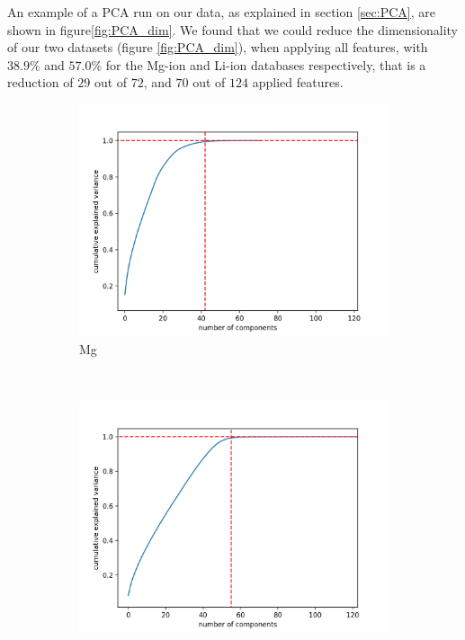 	An example of a PCA run on our data, as explained in section \ref{sec:PCA}, are shown in figure\ref{fig:PCA_dim}. We found that we could reduce the dimensionality of our two datasets (figure \ref{fig:PCA_dim}), when applying all features, with $38.9\%$ and $57.0\%$ for the Mg-ion and Li-ion databases respectively, that is a reduction of $29$ out of $72$, and $70$ out of $124$ applied features. 
		
\begin{figure}[H]
    \centering
    \begin{subfigure}{0.48\textwidth}
        \centering
        \includegraphics[width=\linewidth]{theory/figures/Mg_PCA.png}
        \caption{Mg}
        \label{fig:PCA_b}
    \end{subfigure}
        ~ 
    \begin{subfigure}{0.48\textwidth}
        \centering
        \includegraphics[width=\linewidth]{theory/figures/PCA_reduction_of_dimensionality.png}

\end{subfigure}
\end{figure}
